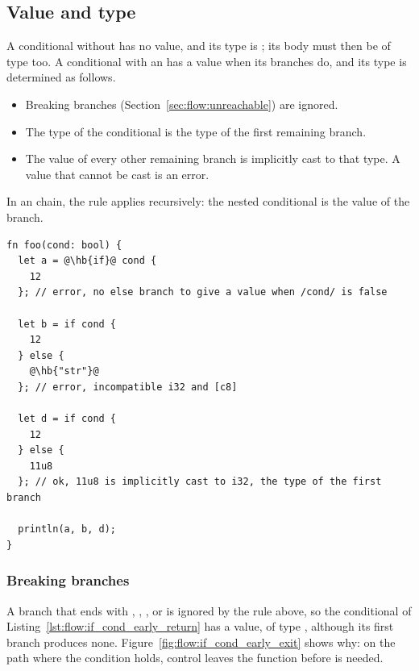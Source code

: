 

\subsection{Value and type}
\label{sec:flow:cond_value_type}

A conditional without  has no value, and its type is ;
its body must then be of type  too. A conditional with an
 has a value when its branches do, and its type is determined as
follows.

\begin{itemize}
\item Breaking branches (Section~\ref{sec:flow:unreachable}) are ignored.
\item The type of the conditional is the type of the first remaining branch.
\item The value of every other remaining branch is implicitly cast to that type.
  A value that cannot be cast is an error.
\end{itemize}

In an  chain, the rule applies recursively: the nested
conditional is the value of the  branch.

\begin{lstlisting}[style=coloredverbatimError, escapechar=@]
fn foo(cond: bool) {
  let a = @\hb{if}@ cond {
    12
  }; // error, no else branch to give a value when /cond/ is false

  let b = if cond {
    12
  } else {
    @\hb{"str"}@
  }; // error, incompatible i32 and [c8]

  let d = if cond {
    12
  } else {
    11u8
  }; // ok, 11u8 is implicitly cast to i32, the type of the first branch

  println(a, b, d);
}
\end{lstlisting}

\subsubsection{Breaking branches}

A branch that ends with , , ,
 or  is ignored by the rule above, so the
conditional of Listing~\ref{lst:flow:if_cond_early_return} has a value, of type
, although its first branch produces none.
Figure~\ref{fig:flow:if_cond_early_exit} shows why: on the path where the
condition holds, control leaves the function before  is needed.

